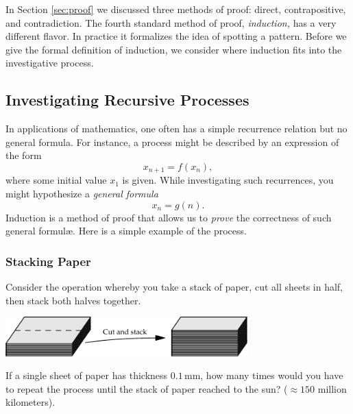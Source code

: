 In Section \ref{sec:proof} we discussed three methods of proof: direct, contrapositive, and contradiction. The fourth standard method of proof, \emph{induction,} has a very different flavor. In practice it formalizes the idea of spotting a pattern. Before we give the formal definition of induction, we consider where induction fits into the investigative process.

\subsection{Investigating Recursive Processes}

In applications of mathematics, one often has a simple recurrence relation but no general formula. For instance, a process might be described by an expression of the form
\[x_{n+1}=f(x_n),\]
where some initial value $x_1$ is given. While investigating such recurrences, you might hypothesize a \emph{general formula}
\[x_n=g(n).\]
Induction is a method of proof that allows us to \emph{prove} the correctness of such general formulæ. Here is a simple example of the process.

\subsubsection*{Stacking Paper}

Consider the operation whereby you take a stack of paper, cut all sheets in half, then stack both halves together.
\begin{center}
\includegraphics[width=0.7\textwidth]{induction-02-paper}
\end{center}
If a single sheet of paper has thickness $0.1$\,mm, how many times would you have to repeat the process until the stack of paper reached to the sun? ($\approx 150$ million kilometers).\\

